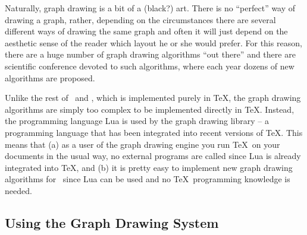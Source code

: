 Naturally, graph drawing is a bit of a (black?) art. There is no ``perfect''
way of drawing a graph, rather, depending on the circumstances there are
several different ways of drawing the same graph and often it will just depend
on the aesthetic sense of the reader which layout he or she would prefer. For
this reason, there are a huge number of graph drawing algorithms ``out there''
and there are scientific conference devoted to such algorithms, where each year
dozens of new algorithms are proposed.

Unlike the rest of \pgfname\ and \tikzname, which is implemented purely in
\TeX, the graph drawing algorithms are simply too complex to be implemented
directly in \TeX. Instead, the programming language Lua is used by the graph
drawing library -- a programming language that has been integrated into recent
versions of \TeX. This means that (a) as a user of the graph drawing engine you
run \TeX\ on your documents in the usual way, no external programs are called
since Lua is already integrated into \TeX, and (b) it is pretty easy to
implement new graph drawing algorithms for \tikzname\ since Lua can be used and
no \TeX\ programming knowledge is needed.


\subsection{Using the Graph Drawing System}

